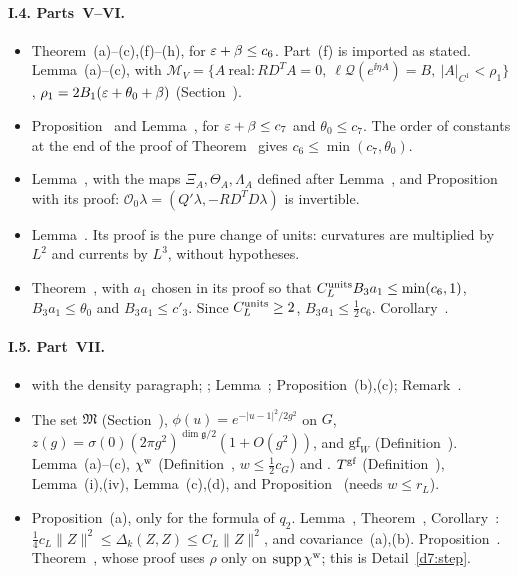 \paragraph{I.4. Parts~V--VI.}
\begin{itemize}
\item Theorem~(a)--(c),(f)--(h), for $\varepsilon+\beta\le c_6$. Part~(f) is imported as stated. Lemma~(a)--(c), with $\mathcal M_V=\{A\ \text{real}:RD^TA=0,\ \ell\mathcal Q(e^{\ii\eta A})=B,\ |A|_{C^1}<\rho_1\}$, $\rho_1=2B_1(\varepsilon+\theta_0+\beta)$ (Section~).
\item Proposition~ and Lemma~, for $\varepsilon+\beta\le c_7$ and $\theta_0\le c_7$. The order of constants at the end of the proof of Theorem~ gives $c_6\le\min(c_7,\theta_0)$.
\item Lemma~,  with the maps $\Xi_A,\Theta_A,\Lambda_A$ defined after Lemma~, and Proposition~ with its proof: $\mathcal O_0\lambda=(Q'\lambda,-RD^TD\lambda)$ is invertible.
\item Lemma~. Its proof is the pure change of units: curvatures are multiplied by $L^2$ and currents by $L^3$, without hypotheses.
\item Theorem~, with $a_1$ chosen in its proof so that $C^{\rm units}_LB_3a_1\le\min(c_6,1)$, $B_3a_1\le\theta_0$ and $B_3a_1\le c'_3$. Since $C^{\rm units}_L\ge2$, $B_3a_1\le\frac12c_6$. Corollary~.
\end{itemize}

\paragraph{I.5. Part~VII.}
\begin{itemize}
\item {} with the density paragraph; ; Lemma~; Proposition~(b),(c); Remark~.
\item The set $\mathfrak M$ (Section~), $\phi(u)=e^{-|u-1|^2/2g^2}$ on $G$, $z(g)=\sigma(0)(2\pi g^2)^{\dim\mathfrak g/2}(1+O(g^2))$, and $\mathrm{gf}_W$ (Definition~). Lemma~(a)--(c), $\chi^{\rm w}$ (Definition~, $w\le\frac12c_G$) and . $T^{\rm gf}$ (Definition~), Lemma~(i),(iv), Lemma~(c),(d), and Proposition~ (needs $w\le r_L$).
\item Proposition~(a), only for the formula of $q_2$. Lemma~, Theorem~, Corollary~: $\frac14c_L\|Z\|^2\le\Delta_k(Z,Z)\le C_L\|Z\|^2$, and covariance~(a),(b). Proposition~. Theorem~, whose proof uses $\rho$ only on $\operatorname{supp}\chi^{\rm w}$; this is Detail~\ref{d7:step}.
\end{itemize}

